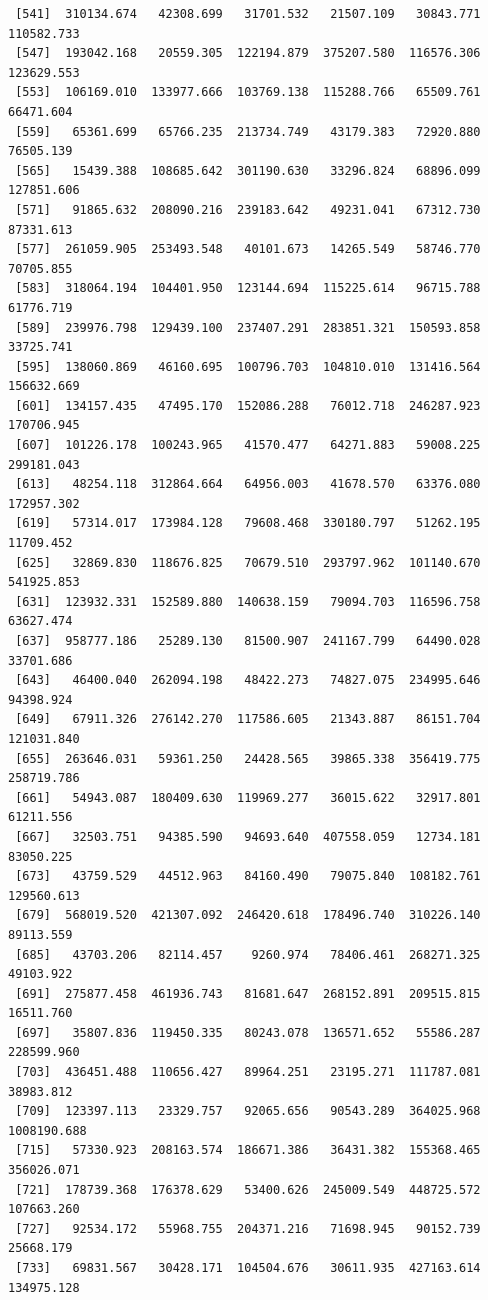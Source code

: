 \documentclass[
  letterpaper,
  DIV=11,
  numbers=noendperiod]{scrartcl}
\begin{document}
\begin{verbatim}
 [541]  310134.674   42308.699   31701.532   21507.109   30843.771  110582.733
 [547]  193042.168   20559.305  122194.879  375207.580  116576.306  123629.553
 [553]  106169.010  133977.666  103769.138  115288.766   65509.761   66471.604
 [559]   65361.699   65766.235  213734.749   43179.383   72920.880   76505.139
 [565]   15439.388  108685.642  301190.630   33296.824   68896.099  127851.606
 [571]   91865.632  208090.216  239183.642   49231.041   67312.730   87331.613
 [577]  261059.905  253493.548   40101.673   14265.549   58746.770   70705.855
 [583]  318064.194  104401.950  123144.694  115225.614   96715.788   61776.719
 [589]  239976.798  129439.100  237407.291  283851.321  150593.858   33725.741
 [595]  138060.869   46160.695  100796.703  104810.010  131416.564  156632.669
 [601]  134157.435   47495.170  152086.288   76012.718  246287.923  170706.945
 [607]  101226.178  100243.965   41570.477   64271.883   59008.225  299181.043
 [613]   48254.118  312864.664   64956.003   41678.570   63376.080  172957.302
 [619]   57314.017  173984.128   79608.468  330180.797   51262.195   11709.452
 [625]   32869.830  118676.825   70679.510  293797.962  101140.670  541925.853
 [631]  123932.331  152589.880  140638.159   79094.703  116596.758   63627.474
 [637]  958777.186   25289.130   81500.907  241167.799   64490.028   33701.686
 [643]   46400.040  262094.198   48422.273   74827.075  234995.646   94398.924
 [649]   67911.326  276142.270  117586.605   21343.887   86151.704  121031.840
 [655]  263646.031   59361.250   24428.565   39865.338  356419.775  258719.786
 [661]   54943.087  180409.630  119969.277   36015.622   32917.801   61211.556
 [667]   32503.751   94385.590   94693.640  407558.059   12734.181   83050.225
 [673]   43759.529   44512.963   84160.490   79075.840  108182.761  129560.613
 [679]  568019.520  421307.092  246420.618  178496.740  310226.140   89113.559
 [685]   43703.206   82114.457    9260.974   78406.461  268271.325   49103.922
 [691]  275877.458  461936.743   81681.647  268152.891  209515.815   16511.760
 [697]   35807.836  119450.335   80243.078  136571.652   55586.287  228599.960
 [703]  436451.488  110656.427   89964.251   23195.271  111787.081   38983.812
 [709]  123397.113   23329.757   92065.656   90543.289  364025.968 1008190.688
 [715]   57330.923  208163.574  186671.386   36431.382  155368.465  356026.071
 [721]  178739.368  176378.629   53400.626  245009.549  448725.572  107663.260
 [727]   92534.172   55968.755  204371.216   71698.945   90152.739   25668.179
 [733]   69831.567   30428.171  104504.676   30611.935  427163.614  134975.128

\end{verbatim}
\end{document}
